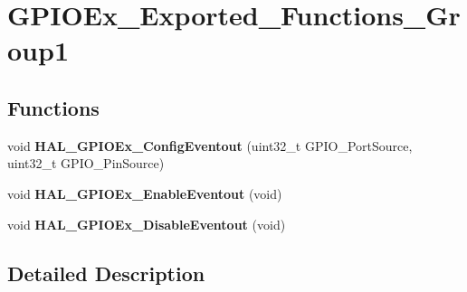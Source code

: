 \hypertarget{group___g_p_i_o_ex___exported___functions___group1}{}\section{G\+P\+I\+O\+Ex\+\_\+\+Exported\+\_\+\+Functions\+\_\+\+Group1}
\label{group___g_p_i_o_ex___exported___functions___group1}
\subsection*{Functions}
\begin{DoxyCompactItemize}
\item 
\mbox{\label{group___g_p_i_o_ex___exported___functions___group1_ga9fbe96e2961dc0e5014e47d97de15cc5}} 
void {\bfseries H\+A\+L\+\_\+\+G\+P\+I\+O\+Ex\+\_\+\+Config\+Eventout} (uint32\+\_\+t G\+P\+I\+O\+\_\+\+Port\+Source, uint32\+\_\+t G\+P\+I\+O\+\_\+\+Pin\+Source)
\item 
\mbox{\label{group___g_p_i_o_ex___exported___functions___group1_ga599b3984a9334d6b55bfb6a26aa8cf51}} 
void {\bfseries H\+A\+L\+\_\+\+G\+P\+I\+O\+Ex\+\_\+\+Enable\+Eventout} (void)
\item 
\mbox{\label{group___g_p_i_o_ex___exported___functions___group1_gab794bd6eb13e63f1c59f222e5c39d8ef}} 
void {\bfseries H\+A\+L\+\_\+\+G\+P\+I\+O\+Ex\+\_\+\+Disable\+Eventout} (void)
\end{DoxyCompactItemize}


\subsection{Detailed Description}
